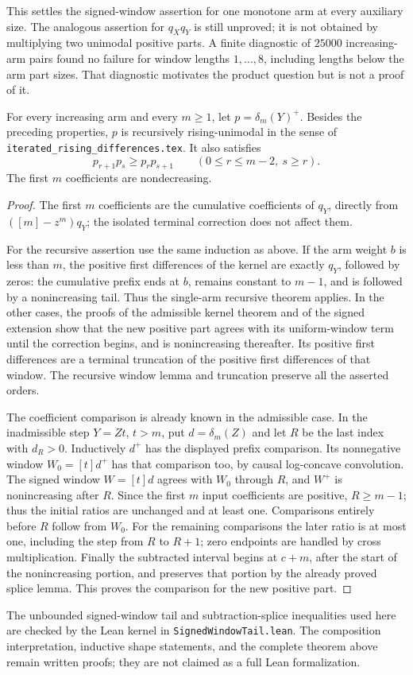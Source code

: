 This settles the signed-window assertion for one monotone arm at
every auxiliary size. The analogous assertion for $q_Xq_Y$ is
still unproved; it is not obtained by multiplying two unimodal
positive parts. A finite diagnostic of $25000$ increasing-arm pairs
found no failure for window lengths $1,\ldots,8$, including lengths
below the arm part sizes. That diagnostic motivates the product
question but is not a proof of it.

\begin{theorem}
For every increasing arm and every $m\ge1$, let
$p=\delta_m(Y)^+$. Besides the preceding properties, $p$ is
recursively rising-unimodal in the sense of
\texttt{iterated\_rising\_differences.tex}. It also satisfies
\[
 p_{r+1}p_s\ge p_rp_{s+1}
 \qquad(0\le r\le m-2,\ s\ge r).
\]
The first $m$ coefficients are nondecreasing.
\end{theorem}
\begin{proof}
The first $m$ coefficients are the cumulative coefficients of
$q_Y$, directly from $([m]-z^m)q_Y$; the isolated terminal
correction does not affect them.

For the recursive assertion use the same induction as above.
If the arm weight $b$ is less than $m$, the positive first
differences of the kernel are exactly $q_Y$, followed by zeros:
the cumulative prefix ends at $b$, remains constant to $m-1$,
and is followed by a nonincreasing tail. Thus the single-arm
recursive theorem applies. In the other cases, the proofs of
the admissible kernel theorem and of the signed extension show
that the new positive part agrees with its uniform-window term
until the correction begins, and is nonincreasing thereafter.
Its positive first differences are a terminal truncation of the
positive first differences of that window. The recursive window
lemma and truncation preserve all the asserted orders.

The coefficient comparison is already known in the admissible
case. In the inadmissible step $Y=Zt$, $t>m$, put
$d=\delta_m(Z)$ and let $R$ be the last index with $d_R>0$.
Inductively $d^+$ has the displayed prefix comparison. Its
nonnegative window $W_0=[t]d^+$ has that comparison too, by
causal log-concave convolution. The signed window $W=[t]d$
agrees with $W_0$ through $R$, and $W^+$ is nonincreasing
after $R$. Since the first $m$ input coefficients are positive,
$R\ge m-1$; thus the initial ratios are unchanged and at
least one. Comparisons entirely before $R$ follow from $W_0$.
For the remaining comparisons the later ratio is at most one,
including the step from $R$ to $R+1$; zero endpoints are
handled by cross multiplication. Finally the subtracted interval
begins at $c+m$, after the start of the nonincreasing portion,
and preserves that portion by the already proved splice lemma.
This proves the comparison for the new positive part.
\end{proof}

The unbounded signed-window tail and subtraction-splice inequalities
used here are checked by the Lean kernel in
\texttt{SignedWindowTail.lean}. The composition interpretation,
inductive shape statements, and the complete theorem above remain
written proofs; they are not claimed as a full Lean formalization.
